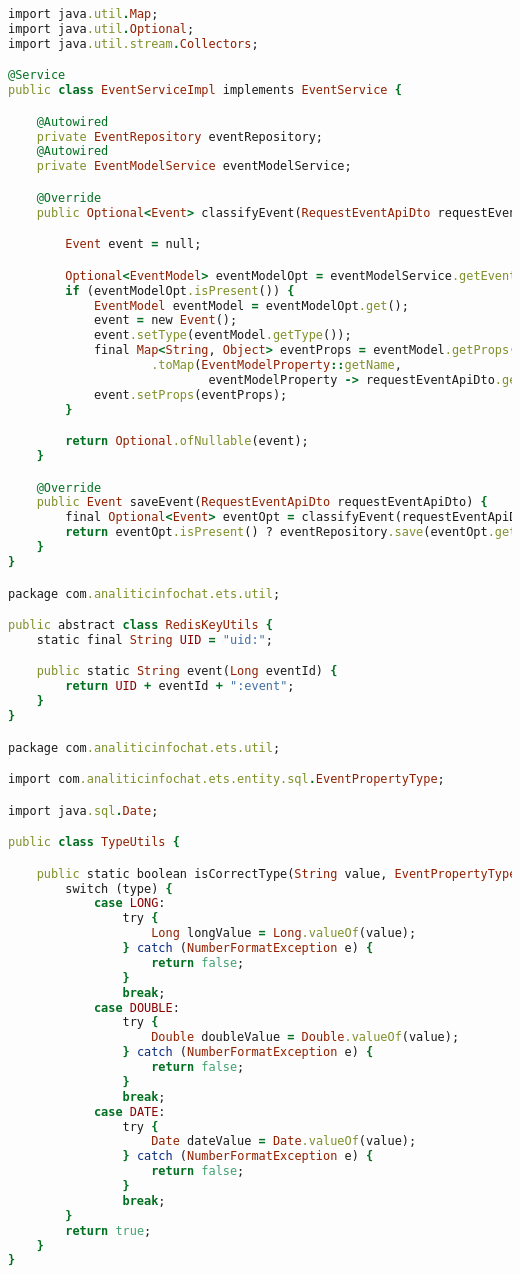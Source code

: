 \begin{lstlisting}[language=Ruby, style=rubystyle]
import java.util.Map;
import java.util.Optional;
import java.util.stream.Collectors;

@Service
public class EventServiceImpl implements EventService {

    @Autowired
    private EventRepository eventRepository;
    @Autowired
    private EventModelService eventModelService;

    @Override
    public Optional<Event> classifyEvent(RequestEventApiDto requestEventApiDto) {

        Event event = null;

        Optional<EventModel> eventModelOpt = eventModelService.getEventModel(requestEventApiDto);
        if (eventModelOpt.isPresent()) {
            EventModel eventModel = eventModelOpt.get();
            event = new Event();
            event.setType(eventModel.getType());
            final Map<String, Object> eventProps = eventModel.getProps().stream().collect(Collectors
                    .toMap(EventModelProperty::getName,
                            eventModelProperty -> requestEventApiDto.getProps().get(eventModelProperty.getName())));
            event.setProps(eventProps);
        }

        return Optional.ofNullable(event);
    }

    @Override
    public Event saveEvent(RequestEventApiDto requestEventApiDto) {
        final Optional<Event> eventOpt = classifyEvent(requestEventApiDto);
        return eventOpt.isPresent() ? eventRepository.save(eventOpt.get()) : null;
    }
}

package com.analiticinfochat.ets.util;

public abstract class RedisKeyUtils {
    static final String UID = "uid:";

    public static String event(Long eventId) {
        return UID + eventId + ":event";
    }
}

package com.analiticinfochat.ets.util;

import com.analiticinfochat.ets.entity.sql.EventPropertyType;

import java.sql.Date;

public class TypeUtils {

    public static boolean isCorrectType(String value, EventPropertyType type) {
        switch (type) {
            case LONG:
                try {
                    Long longValue = Long.valueOf(value);
                } catch (NumberFormatException e) {
                    return false;
                }
                break;
            case DOUBLE:
                try {
                    Double doubleValue = Double.valueOf(value);
                } catch (NumberFormatException e) {
                    return false;
                }
                break;
            case DATE:
                try {
                    Date dateValue = Date.valueOf(value);
                } catch (NumberFormatException e) {
                    return false;
                }
                break;
        }
        return true;
    }
}


\end{lstlisting}
